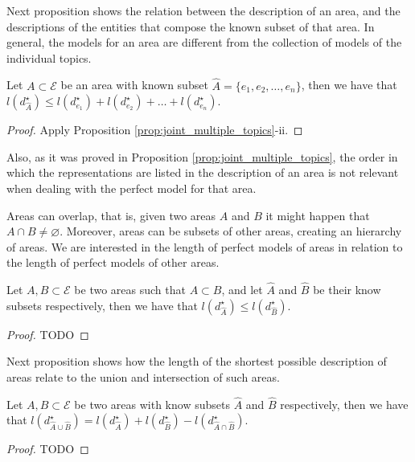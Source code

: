 Next proposition shows the relation between the description of an area, and the descriptions of the entities that compose the known subset of that area. In general, the models for an area are different from the collection of models of the individual topics.

\begin{proposition}
Let $A \subset \mathcal{E}$ be an area with known subset $\hat{A} = \{e_1, e_2, \ldots, e_n\}$, then we have that $l \left( d_{\hat{A}}^{\star} \right) \leq l(d_ {e_1}^\star) + l(d_ {e_2}^\star) + \ldots + l(d_ {e_n}^\star)$.
\end{proposition}
\begin{proof}
Apply Proposition \ref{prop:joint_multiple_topics}-ii. 
\end{proof}

Also, as it was proved in Proposition \ref{prop:joint_multiple_topics}, the order in which the representations are listed in the description of an area is not relevant when dealing with the perfect model for that area.

Areas can overlap, that is, given two areas $A$ and $B$ it might happen that $A \cap B \neq \varnothing$. Moreover, areas can be subsets of other areas, creating an hierarchy of areas. We are interested in the length of perfect models of areas in relation to the length of perfect models of other areas.

\begin{proposition}
Let $A, B \subset \mathcal{E}$ be two areas such that $A \subset B$, and let $\hat{A}$ and $\hat{B}$ be their know subsets respectively, then we have that $l \left( d_{\hat{A}}^{\star} \right) \leq l \left( d_{\hat{B}}^{\star} \right)$.
\end{proposition}
\begin{proof}
{\color{red} TODO}
\end{proof}

Next proposition \label{prop:areas_union} shows how the length of the shortest possible description of areas relate to the union and intersection of such areas.

\begin{proposition}
\label{prop:areas_union}
Let $A, B \subset \mathcal{E}$ be two areas with know subsets $\hat{A}$ and $\hat{B}$ respectively, then we have that $l \left( d_{\hat{A} \cup \hat{B}}^{\star} \right) = l \left( d_{\hat{A}}^{\star} \right) + l \left( d_{\hat{B}}^{\star} \right) - l \left( d_{\hat{A} \cap \hat{B}}^{\star} \right)$.
\end{proposition}
\begin{proof}
{\color{red} TODO}
\end{proof}


